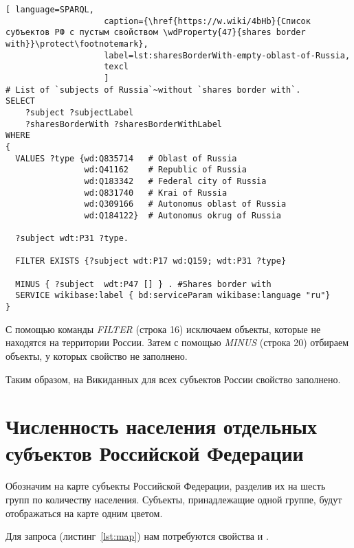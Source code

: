 \lstset{numbers=left, firstnumber=1, frame=single}
\begin{lstlisting}[ language=SPARQL, 
                    caption={\href{https://w.wiki/4bHb}{Список субъектов РФ с пустым свойством \wdProperty{47}{shares border with}}\protect\footnotemark},
                    label=lst:sharesBorderWith-empty-oblast-of-Russia,
                    texcl 
                    ]
# List of `subjects of Russia`~without `shares border with`. 
SELECT 
    ?subject ?subjectLabel 
    ?sharesBorderWith ?sharesBorderWithLabel
WHERE
{
  VALUES ?type {wd:Q835714   # Oblast of Russia
                wd:Q41162    # Republic of Russia
                wd:Q183342   # Federal city of Russia
                wd:Q831740   # Krai of Russia
                wd:Q309166   # Autonomus oblast of Russia
                wd:Q184122}  # Autonomus okrug of Russia
  
  ?subject wdt:P31 ?type.
  
  FILTER EXISTS {?subject wdt:P17 wd:Q159; wdt:P31 ?type}
  
  MINUS { ?subject  wdt:P47 [] } . #Shares border with 
  SERVICE wikibase:label { bd:serviceParam wikibase:language "ru"}
}
\end{lstlisting}%

С помощью команды \textit{FILTER} (строка 16) исключаем объекты, которые не находятся на территории России. Затем с помощью \textit{MINUS} (строка 20) отбираем объекты, у которых свойство  не заполнено.

Таким образом, на Викиданных для всех субъектов России свойство  заполнено.

\section{Численность населения отдельных субъектов Российской Федерации}

Обозначим на карте субъекты Российской Федерации, разделив их на шесть групп по количеству населения. Субъекты, принадлежащие одной группе, будут отображаться на карте одним цветом.

Для запроса (листинг~\protect\ref{lst:map}) нам потребуются свойства  и .

